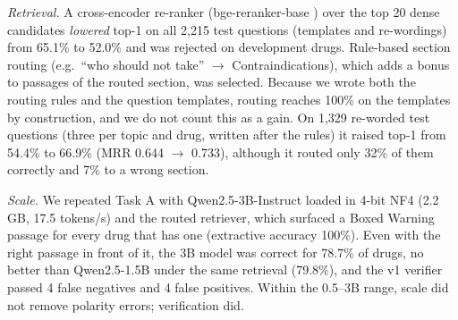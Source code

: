 \documentclass[conference]{IEEEtran}
\begin{document}
\begin{table}[t]
\caption{Verifier variants on identical Task A drafts: system accuracy and verified wrong answers (false ``no'' / false ``yes'')}
\label{tab:v2}
\centering
\setlength{\tabcolsep}{3pt}
\end{table}

\emph{Retrieval.} A cross-encoder re-ranker (bge-reranker-base \cite{xiao2023cpack}) over the top 20 dense candidates \emph{lowered} top-1 on all 2{,}215 test questions (templates and re-wordings) from 65.1\% to 52.0\% and was rejected on development drugs. Rule-based section routing (e.g.\ ``who should not take'' $\to$ Contraindications), which adds a bonus to passages of the routed section, was selected. Because we wrote both the routing rules and the question templates, routing reaches 100\% on the templates by construction, and we do not count this as a gain. On 1{,}329 re-worded test questions (three per topic and drug, written after the rules) it raised top-1 from 54.4\% to 66.9\% (MRR 0.644 $\to$ 0.733), although it routed only 32\% of them correctly and 7\% to a wrong section.

\emph{Scale.} We repeated Task A with Qwen2.5-3B-Instruct loaded in 4-bit NF4 \cite{dettmers2023qlora} (2.2\,GB, 17.5 tokens/s) and the routed retriever, which surfaced a Boxed Warning passage for every drug that has one (extractive accuracy 100\%). Even with the right passage in front of it, the 3B model was correct for 78.7\% of drugs, no better than Qwen2.5-1.5B under the same retrieval (79.8\%), and the v1 verifier passed 4 false negatives and 4 false positives. Within the 0.5--3B range, scale did not remove polarity errors; verification did.
\end{document}
